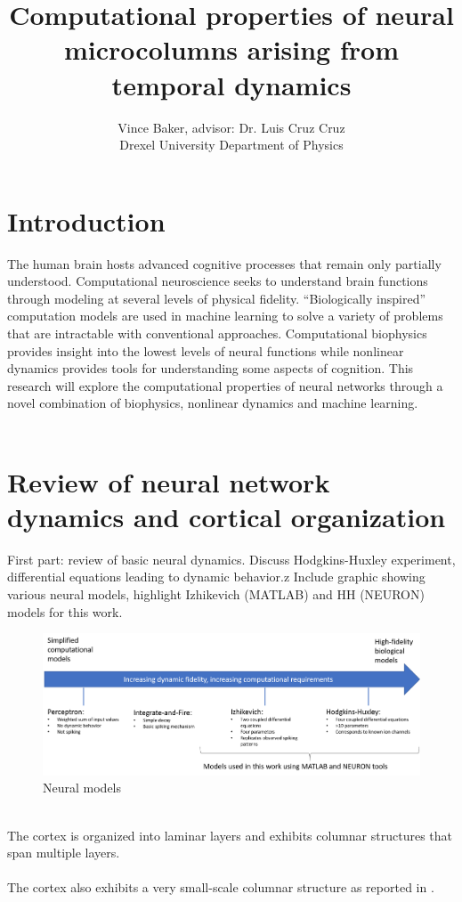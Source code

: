 \documentclass[a4paper,11pt]{article}
\title{Computational properties of neural microcolumns arising from temporal dynamics}
\author{Vince Baker, advisor: Dr. Luis Cruz Cruz\\ Drexel University Department of Physics}
\begin{document}
\maketitle

\section{Introduction} 
The human brain hosts advanced cognitive processes that remain only partially understood.
Computational neuroscience seeks to understand brain functions through modeling at several levels of physical fidelity.
``Biologically inspired'' computation models are used in machine learning to solve a variety of problems that are intractable with conventional approaches.
Computational biophysics provides insight into the lowest levels of neural functions while nonlinear dynamics provides tools for understanding some aspects of cognition.
This research will explore the computational properties of neural networks through a novel combination of biophysics, nonlinear dynamics and machine learning.
\\ \\
\section{Review of neural network dynamics and cortical organization}
First part: review of basic neural dynamics.
Discuss Hodgkins-Huxley experiment, differential equations leading to dynamic behavior.z
Include graphic showing various neural models, highlight Izhikevich \cite{izhikevich2003} (MATLAB) and HH (NEURON) models for this work.
\begin{figure}[ht]
 \caption{Neural models}
 \centering
   \includegraphics[width=\textwidth]{fig/neural_models}
\end{figure}\\
The cortex is organized into laminar layers and exhibits columnar structures that span multiple layers. \\ \\
The cortex also exhibits a very small-scale columnar structure as reported in \cite{cruz2000}\cite{cruz2009}. \\ \\
\\ \\
\end{document}
